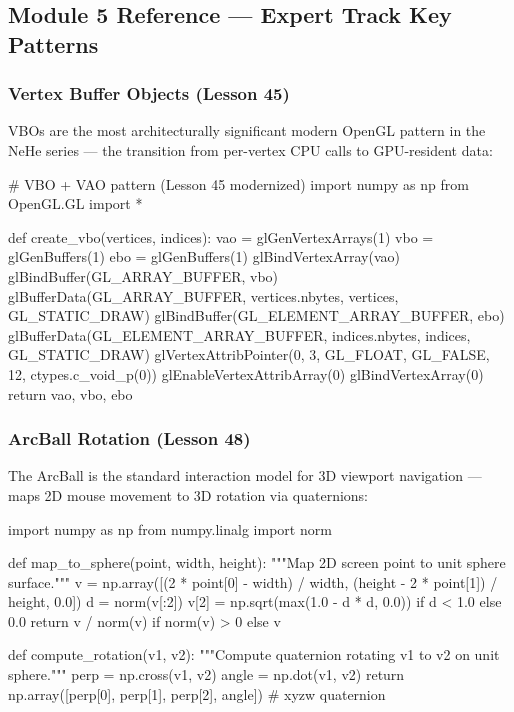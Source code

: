 \documentclass[11pt,letterpaper]{article}
\begin{document}
\subsection{Module 5 Reference --- Expert Track Key Patterns}

\subsubsection{Vertex Buffer Objects (Lesson 45)}

VBOs are the most architecturally significant modern OpenGL pattern in the NeHe series --- the transition from per-vertex CPU calls to GPU-resident data:

\begin{codebox}
# VBO + VAO pattern (Lesson 45 modernized)
import numpy as np
from OpenGL.GL import *

def create_vbo(vertices, indices):
    vao = glGenVertexArrays(1)
    vbo = glGenBuffers(1)
    ebo = glGenBuffers(1)
    glBindVertexArray(vao)
    glBindBuffer(GL_ARRAY_BUFFER, vbo)
    glBufferData(GL_ARRAY_BUFFER, vertices.nbytes, vertices, GL_STATIC_DRAW)
    glBindBuffer(GL_ELEMENT_ARRAY_BUFFER, ebo)
    glBufferData(GL_ELEMENT_ARRAY_BUFFER, indices.nbytes, indices, GL_STATIC_DRAW)
    glVertexAttribPointer(0, 3, GL_FLOAT, GL_FALSE, 12, ctypes.c_void_p(0))
    glEnableVertexAttribArray(0)
    glBindVertexArray(0)
    return vao, vbo, ebo
\end{codebox}

\subsubsection{ArcBall Rotation (Lesson 48)}

The ArcBall is the standard interaction model for 3D viewport navigation --- maps 2D mouse movement to 3D rotation via quaternions:

\begin{codebox}
import numpy as np
from numpy.linalg import norm

def map_to_sphere(point, width, height):
    """Map 2D screen point to unit sphere surface."""
    v = np.array([(2 * point[0] - width) / width,
                  (height - 2 * point[1]) / height, 0.0])
    d = norm(v[:2])
    v[2] = np.sqrt(max(1.0 - d * d, 0.0)) if d < 1.0 else 0.0
    return v / norm(v) if norm(v) > 0 else v

def compute_rotation(v1, v2):
    """Compute quaternion rotating v1 to v2 on unit sphere."""
    perp = np.cross(v1, v2)
    angle = np.dot(v1, v2)
    return np.array([perp[0], perp[1], perp[2], angle])  # xyzw quaternion
\end{codebox}
\end{document}
